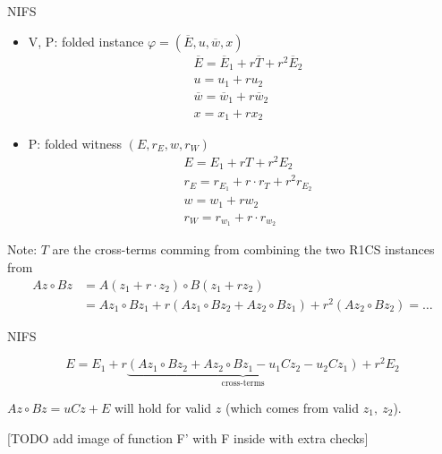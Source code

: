 \documentclass{beamer}
\begin{document}
\begin{frame}{NIFS}
\begin{footnotesize}

\begin{itemize}
      \item V, P: folded instance $\varphi = (\overline{E}, u, \overline{w}, x)$
	      \begin{align*}
		      &\overline{E}=\overline{E}_1 + r \overline{T} + r^2 \overline{E}_2\\
		      &u = u_1 + r u_2\\
		      &\overline{w} = \overline{w}_1 + r \overline{w}_2\\
		      &x = x_1 + r x_2
	      \end{align*}
      \item P: folded witness $(E, r_E, w, r_W)$
	      \begin{align*}
		      &E = E_1 + r T + r^2 E_2\\
		      &r_E = r_{E_1} + r \cdot r_T + r^2 r_{E_2}\\
		      &w=w_1 + r w_2\\
		      &r_W = r_{w_1} + r \cdot r_{w_2}
	      \end{align*}
\end{itemize}
\end{footnotesize}
\pause
\begin{scriptsize}
Note: $T$ are the cross-terms comming from combining the two R1CS instances from
\begin{align*}
  Az \circ Bz &=A(z_1 + r \cdot z_2) \circ B(z_1 + r z_2)\\
	      &=A z_1 \circ B z_1 + r(A z_1 \circ B z_2 + A z_2 \circ B z_1) + r^2 (A z_2 \circ B z_2) = \ldots
\end{align*}
\end{scriptsize}

\end{frame}

\begin{frame}{NIFS}

\begin{small}
$$E=E_1 + r \underbrace{ (A z_1 \circ B z_2 + A z_2 \circ B z_1 - u_1 C z_2 - u_2 C z_1) }_\text{cross-terms} + r^2 E_2$$
\end{small}

$Az \circ Bz = uCz + E$ will hold for valid $z$ (which comes from valid $z_1,~ z_2$).

[TODO add image of function F' with F inside with extra checks]

\end{frame}
\end{document}
